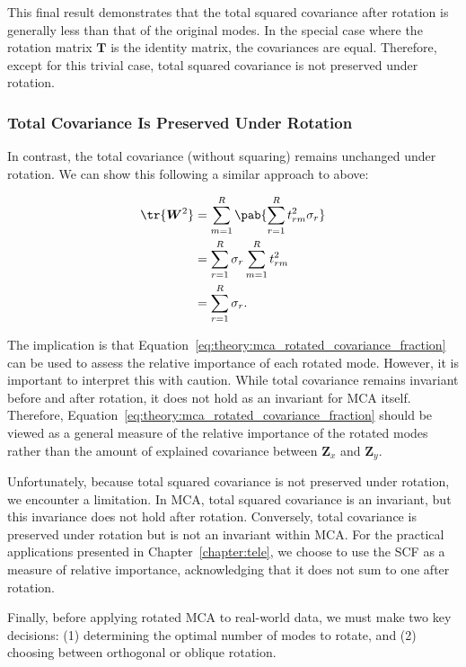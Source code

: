 This final result demonstrates that the total squared covariance after rotation is generally less than that of the original modes. In the special case where the rotation matrix $\bm{T}$ is the identity matrix, the covariances are equal. Therefore, except for this trivial case, total squared covariance is not preserved under rotation.



\subsubsection*{Total Covariance Is Preserved Under Rotation}

In contrast, the total covariance (without squaring) remains unchanged under rotation. We can show this following a similar approach to above:

\begin{align}
    \tr{\bm{W}^2} &= \sum_{m=1}^{R} \pab{\sum_{r=1}^{R}  t_{rm}^2 \sigma_r} \nonumber\\
    &= \sum_{r=1}^{R} \sigma_r \sum_{m=1}^{R} t_{rm}^2 \nonumber\\
    &= \sum_{r=1}^R \sigma_r.
\end{align}

The implication is that Equation~\eqref{eq:theory:mca_rotated_covariance_fraction} can be used to assess the relative importance of each rotated mode. However, it is important to interpret this with caution. While total covariance remains invariant before and after rotation, it does not hold as an invariant for MCA itself. Therefore, Equation~\eqref{eq:theory:mca_rotated_covariance_fraction} should be viewed as a general measure of the relative importance of the rotated modes rather than the amount of explained covariance between $\bm{Z}_x$ and $\bm{Z}_y$.

Unfortunately, because total squared covariance is not preserved under rotation, we encounter a limitation. In MCA, total squared covariance is an invariant, but this invariance does not hold after rotation. Conversely, total covariance is preserved under rotation but is not an invariant within MCA. For the practical applications presented in Chapter~\ref{chapter:tele}, we choose to use the SCF as a measure of relative importance, acknowledging that it does not sum to one after rotation.

Finally, before applying rotated MCA to real-world data, we must make two key decisions: (1) determining the optimal number of modes to rotate, and (2) choosing between orthogonal or oblique rotation.

